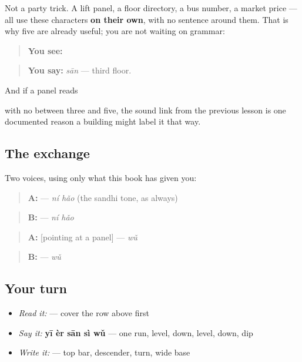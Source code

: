 \begin{culture}
Not a party trick. A lift panel, a floor directory, a bus number, a market price — all use these characters \textbf{on their own}, with no sentence around them. That is why five are already useful; you are not waiting on grammar:

\begin{quote}
\textbf{You see:} 
\end{quote}

\begin{quote}
\textbf{You say:} \emph{sān} — third floor.
\end{quote}

And if a panel reads

\begin{quote}
   
\end{quote}

with no  between three and five, the sound link from the previous lesson is one documented reason a building might label it that way.
\end{culture}

\subsection*{The exchange}
Two voices, using only what this book has given you:

\begin{quote}
\textbf{A:}  — \emph{ní hǎo} (the sandhi tone, as always)
\end{quote}

\begin{quote}
\textbf{B:}  — \emph{ní hǎo}
\end{quote}

\begin{quote}
\textbf{A:} {[}pointing at a panel{]}  — \emph{wǔ}
\end{quote}

\begin{quote}
\textbf{B:}  — \emph{wǔ}
\end{quote}

\subsection*{Your turn}
\begin{itemize}
\raggedright
  \item \emph{Read it:}      — cover the row above first
  \item \emph{Say it:} \textbf{yī èr sān sì wǔ} — one run, level, down, level, down, dip
  \item \emph{Write it:}  — top bar, descender, turn, wide base
\end{itemize}

